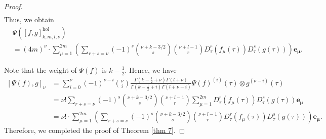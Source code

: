 \documentclass[10pt,a4paper]{amsart}
\begin{document}
\begin{proof}
\begin{equation*}
\begin{aligned}
        \end{aligned}
    \end{equation*}
    Thus, we obtain 
    \begin{equation*}
        \begin{aligned}
            &\Psi\left([f,g]^{\mathrm{hol}}_{k,m,l,\nu}\right)\\
            &= (4m)^{\nu}\cdot\sum_{\mu=1}^{2m}\left(\sum_{r+s=\nu}(-1)^{s}\binom{\nu+k-3/2}{s}\binom{\nu+l-1}{r} D_{\tau}^{r}(f_{\mu}(\tau))D_{\tau}^{s}(g(\tau))\right)\mathbf{e_{\mu}}.
        \end{aligned}
    \end{equation*}

    Note that the weight of $\Psi(f)$ is $k-\frac{1}{2}$. 
    Hence, we have
    \begin{equation*}
        \begin{aligned}
            [\Psi(f),g]_{\nu}&=\sum_{i=0}^{\nu} (-1)^{\nu-i} \binom{\nu}{i}\frac{\Gamma(k-\frac{1}{2}+\nu)\Gamma(l+\nu)}{\Gamma(k-\frac{1}{2}+i)\Gamma(l+\nu-i)}\Psi(f)^{(i)}(\tau)\otimes g^{(\nu-i)}(\tau)\\
            &=\nu!\sum_{r+s=\nu} (-1)^{s} \binom{\nu+k-3/2}{s}\binom{\nu+l-1}{r} \sum_{\mu=1}^{2m} D_{\tau}^{r}(f_{\mu}(\tau))D_{\tau}^{s}(g(\tau)) \mathbf{e_{\mu}}\\
            &=\nu!\cdot\sum_{\mu=1}^{2m}\left(\sum_{r+s=\nu} (-1)^{s} \binom{\nu+k-3/2}{s}\binom{\nu+l-1}{r}  D_{\tau}^{r}(f_{\mu}(\tau))D_{\tau}^{s}(g(\tau))\right)\mathbf{e_{\mu}}.
        \end{aligned}
    \end{equation*}
    Therefore, we completed the proof of Theorem \ref{thm 7}.
\end{proof}
\end{document}
